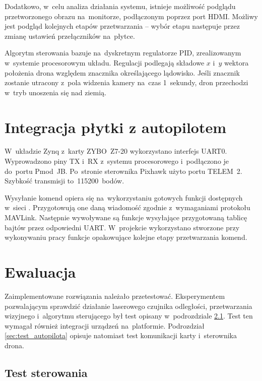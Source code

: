 Dodatkowo, w~celu analiza działania systemu, istnieje możliwość podglądu przetworzonego obrazu na~monitorze, podłączonym poprzez port HDMI. 
Możliwy jest podgląd kolejnych etapów przetwarzania -- wybór etapu następuje przez zmianę ustawień przełączników na~płytce.

Algorytm sterowania bazuje na~dyskretnym regulatorze PID, zrealizowanym w~systemie procesorowym układu.
Regulacji podlegają składowe $x$ i~$y$ wektora położenia drona względem znacznika określającego lądowisko. 
Jeśli znacznik zostanie utracony z~pola widzenia kamery na~czas 1~sekundy, dron przechodzi w~tryb unoszenia się nad ziemią.

\section{Integracja płytki z autopilotem}
\label{sec:integracja_plytka_autopilot}

W~układzie Zynq z~karty ZYBO~Z7-20 wykorzystano interfejs UART0. 
Wyprowadzono piny TX i~RX z~systemu procesorowego i~podłączono je do~portu Pmod~JB. 
Po~stronie sterownika Pixhawk użyto portu TELEM~2. 
Szybkość transmisji to~115200~bodów.

Wysyłanie komend opiera się na~wykorzystaniu gotowych funkcji dostępnych w~sieci \cite{github_mavlink}.
Przygotowują one daną wiadomość zgodnie z~wymaganiami protokołu MAVLink. 
Następnie wywoływane są funkcje wysyłające przygotowaną tablicę bajtów przez odpowiedni UART. 
W~projekcie wykorzystano stworzone przy wykonywaniu pracy \cite{mgr} funkcje opakowujące kolejne etapy przetwarzania komend.

\section{Ewaluacja}
\label{sec:ewaluacja_sprzetu}

Zaimplementowane rozwiązania należało przetestować. Eksperymentem pozwalającym sprawdzić działanie laserowego czujnika odległości, przetwarzania wizyjnego i~algorytmu sterującego był test opisany w~podrozdziale \ref{sec:test_sterowania}. Test ten wymagał również integracji urządzeń na~platformie. Podrozdział \ref{sec:test_autopilota} opisuje natomiast test komunikacji karty i~sterownika drona. 

\subsection{Test sterowania}
\label{sec:test_sterowania}

